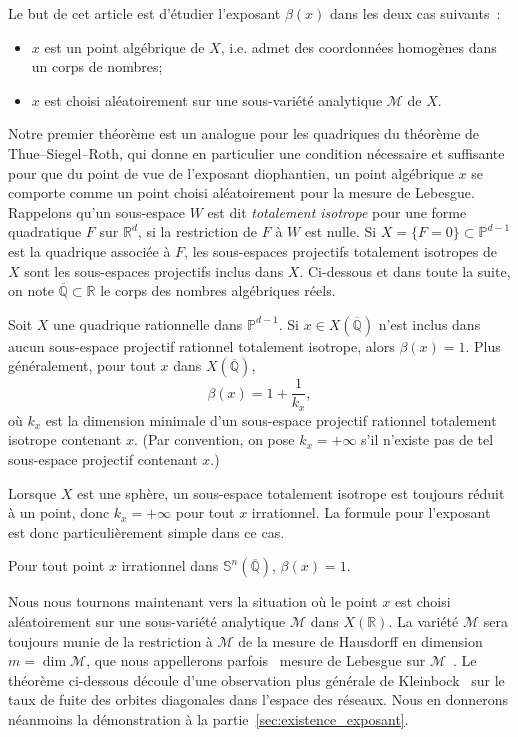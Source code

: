 \documentclass[AHL,Unicode,longabstracts,francais,published]{cedram}
\newcommand{\R}{\mathbb{R}}
\newcommand{\PP}{\mathbb{P}}
\newcommand{\QQ}{\overline{\mathbb{Q}}}
\newcommand{\NS}{\mathbb{S}}
\newcommand{\cM}{\mathcal{M}}
\begin{document}
Le but de cet article est d'étudier l'exposant $\beta(x)$ dans les deux cas suivants~:
\begin{itemize}
\item $x$ est un point algébrique de $X$, i.e. admet des coordonnées homogènes dans un corps de nombres;
\item $x$ est choisi aléatoirement sur une sous-variété analytique $\cM$ de $X$.
\end{itemize}
Notre premier théorème est un analogue pour les quadriques du théorème de Thue--Siegel--Roth, qui donne en particulier une condition nécessaire et suffisante pour que du point de vue de l'exposant diophantien, un point algébrique $x$ se comporte comme un point choisi aléatoirement pour la mesure de Lebesgue. Rappelons qu'un sous-espace $W$ est dit \emph{totalement isotrope} pour une forme quadratique $F$ sur $\R^d$, si la restriction de $F$ à $W$ est nulle. Si $X=\{F=0\}\subset\PP^{d-1}$ est la quadrique associée à $F$, les sous-espaces projectifs totalement isotropes de $X$ sont les sous-espaces projectifs inclus dans $X$. Ci-dessous et dans toute la suite, on note $\QQ\subset\R$ le corps des nombres algébriques réels.

\begin{theo}\label{roth_quadrique}
Soit $X$ une quadrique rationnelle dans $\PP^{d-1}$. Si $x\in X(\QQ)$ n'est inclus dans aucun sous-espace projectif rationnel totalement isotrope, alors $\beta(x)=1$. Plus généralement, pour tout $x$ dans $X(\QQ)$,
\[
\beta(x) = 1 + \frac{1}{k_x},
\]
où $k_x$ est la dimension minimale d'un sous-espace projectif rationnel totalement isotrope contenant $x$. (Par convention, on pose $k_x=+\infty$ s'il n'existe pas de tel sous-espace projectif contenant $x$.)
\end{theo}

Lorsque $X$ est une sphère, un sous-espace totalement isotrope est toujours réduit à un point, donc $k_x=+\infty$ pour tout $x$ irrationnel. La formule pour l'exposant est donc particulièrement simple dans ce cas.

\begin{coro}
Pour tout point $x$ irrationnel dans $\NS^n(\QQ)$, $\beta(x)=1$.
\end{coro}

Nous nous tournons maintenant vers la situation où le point $x$ est choisi aléatoirement sur une sous-variété analytique $\cM$ dans $X(\R)$. La variété $\cM$ sera toujours munie de la restriction à $\cM$ de la mesure de Hausdorff en dimension $m=\dim\cM$, que nous appellerons parfois \og~mesure de Lebesgue sur $\cM$~\fg{}. Le théorème ci-dessous découle d'une observation plus générale de Kleinbock~\cite{kleinbock_dichotomy} sur le taux de fuite des orbites diagonales dans l'espace des réseaux. Nous en donnerons néanmoins la démonstration à la partie~\ref{sec:existence_exposant}.
\end{document}

